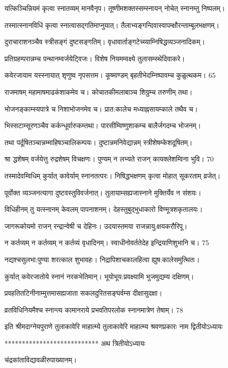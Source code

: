 यत्किञ्चिन्नियमं कृत्वा स्नातव्यम् मानवैनृप।
तूष्णीमशक्तस्सम्स्नायन् नोचेत् स्नानम्तु निष्पलम्।

तस्मात्स्नानविधिं कृत्वा स्नात्वासद्गतिमाप्नुयात्।
तैलाभ्यङ्गन्दिवास्वापम्क्षौरन्ताम्बूलभक्षणम्।

दुराचाराशनञ्चैव स्त्रीसङ्गं दुष्टसङ्गतिम्।
वृधावार्ताङ्गटेच्य्याम्निषिद्धव्यञ्जनादिकम्।

प्रतिग्रहम्परान्नम्च पन्थानम्वर्जयेट्विजः।
विशेष नियमम्वक्ष्ये तुलासम्स्थेदिवाकरे।

कवेरजायाम यस्स्नायात् शृणुष्व नृपसत्तम।
कूष्माण्डम् बृहतीभेदम्निष्पावम्च कुळुत्थकम। 65

राजमाषम् महामाषमाढकंशाकमेव च।
कोचातकीमलाबाञ्च शिग्रुम्च तरुणीम् तथा।

भोजनङ्काम्स्यपात्रे च निशाभोजनमेव च।
प्रात:कालेच मध्याह्नसायम्काले तथैव च।

भिस्सटाम्सूरणञ्चैव कर्कन्धूर्वारुकम्तथा।
पारसीम्विष्णुशाकम्च बालैर्जगदम्च भोजनम्।

तथा पर्दूषितञ्चान्नम्माहिषञ्चालिकम्पयः।
दुष्टान्नमनिवेद्यान्नम् स्त्रीशेषम्केशदूषितम्।

श्रा द्धशेषम् वर्जयेत्तु रुद्रशेषम् विचक्षणः।
पुण्यम् न लभ्यते राजन् कायक्लेशम्विना भुवि। 70

तस्मादेवम्विधिम् कुर्यात् कावेर्याम् स्नानतत्परः।
निषिद्धभक्षणम् कृत्वा मोहात् सूकरताम् व्रजेत्।

पूर्वोक्त व्यञ्जनत्यागा दुष्टवस्तुविवर्जनात्।
तुलायाम्सह्यजास्नाने मुक्तिर्येव न संशयः।

विधिहीनम् तु यत्स्नानम् केवलम् पापनाशनम्।
देहस्तुबुद्भुधाकारो विण्मूत्रशकृतालयः।

जागरूकोयमो राजन् रन्द्रान्वेषी च देहिनः।
उदयास्तमया राजन्नायु:क्षयकरौरिपू।

न कर्तव्यम् न कर्तव्यम् न कर्तव्यं वृधादिनम्।
स्वाधीनोवर्ततेदेह इन्द्रियाणिशुभानि च। 75

नद्यश्चसुलभा:पुण्या शरत्काल शुभावहः।
निद्रापिशाचकालहित्वा ह्युष:कालेसमुत्थितः।

कुर्यात् कवेरजातोये स्नानं नरकभेतिमान्।
भूयोभूय:प्रवक्ष्यामि भुजमुद्यम्य दक्षिणम्।

प्रवहतितटिनीनाम्मुत्तमासह्यजाता
सकलदुरितसङ्घर्वम्स दीक्षासुदक्षा।

व्रतविधिनियमैश्च स्नान्त्य कामानराये
प्रभवतिपरलोक स्नानमात्रेण तेषाम्। 78

इति श्रीमदाग्नेयपुराणे तुलाकावेरि माहात्म्ये तुलाकावेरि माहात्म्य श्रवणप्रकारः नाम द्वितीयोऽध्यायः

***************************
अथ त्रितीयोऽध्यायः

चंद्रकांताविद्यावळीरुपाख्यानम्।

